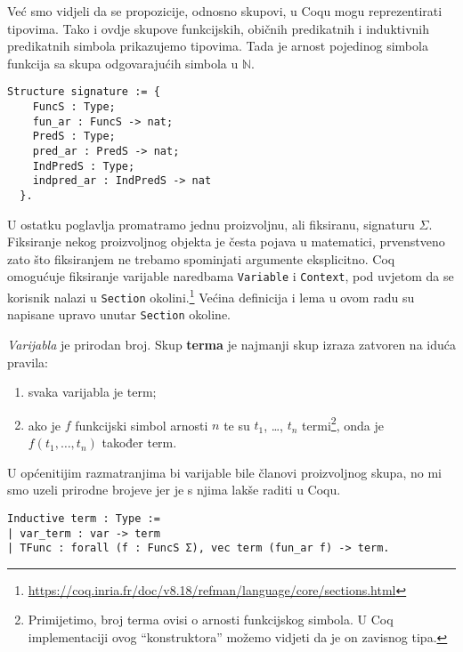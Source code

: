 \noindent Već smo vidjeli da se propozicije, odnosno skupovi, u Coqu mogu reprezentirati tipovima.
Tako i ovdje skupove funkcijskih, običnih predikatnih i induktivnih predikatnih
simbola prikazujemo tipovima.
Tada je arnost pojedinog simbola funkcija sa skupa odgovarajućih simbola u \(\mathbb{N}\).
\begin{verbatim}
Structure signature := {
    FuncS : Type;
    fun_ar : FuncS -> nat;
    PredS : Type;
    pred_ar : PredS -> nat;
    IndPredS : Type;
    indpred_ar : IndPredS -> nat
  }.
\end{verbatim}

\noindent U ostatku poglavlja promatramo jednu proizvoljnu, ali fiksiranu, signaturu \(\Sigma\).
Fiksiranje nekog proizvoljnog objekta je česta pojava u matematici,
prvenstveno zato što fiksiranjem ne trebamo spominjati argumente eksplicitno.
Coq omogućuje fiksiranje varijable naredbama \texttt{Variable} i \texttt{Context},
pod uvjetom da se korisnik nalazi u \texttt{Section} okolini.\footnote{\url{https://coq.inria.fr/doc/v8.18/refman/language/core/sections.html}}
Većina definicija i lema u ovom radu su napisane upravo unutar \texttt{Section} okoline.

\begin{definition}\label{def:term}
  \textit{Varijabla} je prirodan broj. Skup \textbf{terma} je najmanji skup izraza zatvoren na iduća pravila:
  \begin{enumerate}
  \item svaka varijabla je term;
  \item ako je \(f\) funkcijski simbol arnosti \(n\) te su \(t_{1}\), \ldots, \(t_{n}\) termi\footnote{Primijetimo, broj terma ovisi o arnosti funkcijskog simbola. U Coq implementaciji ovog ``konstruktora'' možemo vidjeti da je on zavisnog tipa.},
    onda je \(f(t_{1}, \ldots, t_{n})\) također term.
  \end{enumerate}
\end{definition}
U općenitijim razmatranjima bi varijable bile članovi proizvoljnog skupa,
no mi smo uzeli prirodne brojeve jer je s njima lakše raditi u Coqu.

\begin{verbatim}
Inductive term : Type :=
| var_term : var -> term 
| TFunc : forall (f : FuncS Σ), vec term (fun_ar f) -> term.
\end{verbatim}

